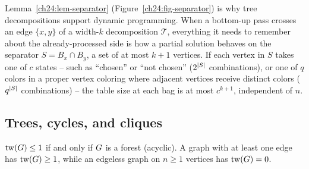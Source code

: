 \begin{whybox}
Lemma~\ref{ch24:lem-separator} (Figure~\ref{ch24:fig-separator}) is why tree decompositions support dynamic programming. When a bottom-up pass crosses an edge $\{x,y\}$ of a width-$k$ decomposition $\mathcal{T}$, everything it needs to remember about the already-processed side is how a partial solution behaves on the separator $S=B_x\cap B_y$, a set of at most $k+1$ vertices. If each vertex in $S$ takes one of $c$ states -- such as ``chosen'' or ``not chosen'' ($2^{\lvert S\rvert}$ combinations), or one of $q$ colors in a proper vertex coloring where adjacent vertices receive distinct colors ($q^{\lvert S\rvert}$ combinations) -- the table size at each bag is at most $c^{k+1}$, independent of $n$.
\end{whybox}

\subsection{Trees, cycles, and cliques}

\begin{proposition}
\label{ch24:prop-trees}
$\operatorname{tw}(G)\le 1$ if and only if $G$ is a forest (acyclic). A graph with at
least one edge has $\operatorname{tw}(G)\ge 1$, while an edgeless graph on $n\ge 1$ vertices
has $\operatorname{tw}(G)=0$.
\end{proposition}

